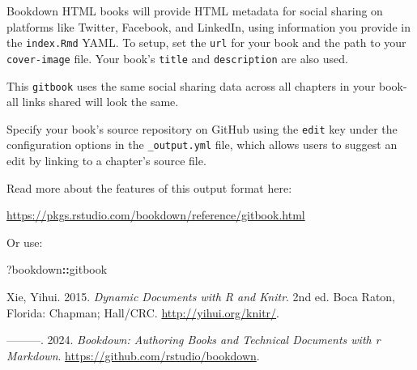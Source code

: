 \documentclass[
]{book}
\newenvironment{Shaded}{\begin{snugshade}}{\end{snugshade}}
\newcommand{\NormalTok}[1]{#1}
\newcommand{\SpecialCharTok}[1]{\textcolor[rgb]{0.81,0.36,0.00}{\textbf{#1}}}
\newlength{\cslhangindent}
\newlength{\cslentryspacingunit} %
\newenvironment{CSLReferences}[2] %
 {%
  \setlength{\parindent}{0pt}
  \ifodd #1
  \let\oldpar\par
  \def\par{\hangindent=\cslhangindent\oldpar}
  \fi
  \setlength{\parskip}{#2\cslentryspacingunit}
 }%
 {}
\begin{document}
Bookdown HTML books will provide HTML metadata for social sharing on
platforms like Twitter, Facebook, and LinkedIn, using information you
provide in the \texttt{index.Rmd} YAML. To setup, set the \texttt{url}
for your book and the path to your \texttt{cover-image} file. Your
book's \texttt{title} and \texttt{description} are also used.

This \texttt{gitbook} uses the same social sharing data across all
chapters in your book- all links shared will look the same.

Specify your book's source repository on GitHub using the \texttt{edit}
key under the configuration options in the \texttt{\_output.yml} file,
which allows users to suggest an edit by linking to a chapter's source
file.

Read more about the features of this output format here:

\url{https://pkgs.rstudio.com/bookdown/reference/gitbook.html}

Or use:

\begin{Shaded}
\begin{Highlighting}[]
\NormalTok{?bookdown}\SpecialCharTok{::}\NormalTok{gitbook}
\end{Highlighting}
\end{Shaded}

\hypertarget{refs}{}
\begin{CSLReferences}{1}{0}
\leavevmode{}%
Xie, Yihui. 2015. \emph{Dynamic Documents with {R} and Knitr}. 2nd ed.
Boca Raton, Florida: Chapman; Hall/CRC. \url{http://yihui.org/knitr/}.

\leavevmode{}%
---------. 2024. \emph{Bookdown: Authoring Books and Technical Documents
with r Markdown}. \url{https://github.com/rstudio/bookdown}.

\end{CSLReferences}

\backmatter
\end{document}
